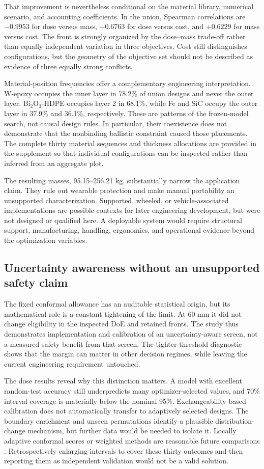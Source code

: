 \documentclass[12pt]{elsarticle}
\begin{document}
That improvement is nevertheless conditional on the material library, numerical scenario, and accounting coefficients. In the union, Spearman correlations are $-0.9953$ for dose versus mass, $-0.6763$ for dose versus cost, and $+0.6229$ for mass versus cost. The front is strongly organized by the dose--mass trade-off rather than equally independent variation in three objectives. Cost still distinguishes configurations, but the geometry of the objective set should not be described as evidence of three equally strong conflicts.

Material-position frequencies offer a complementary engineering interpretation. W-epoxy occupies the inner layer in 78.2\% of union designs and never the outer layer. Bi$_2$O$_3$-HDPE occupies layer 2 in 68.1\%, while Fe and SiC occupy the outer layer in 37.9\% and 36.1\%, respectively. These are patterns of the frozen-model search, not causal design rules. In particular, their coexistence does not demonstrate that the nonbinding ballistic constraint caused those placements. The complete thirty material sequences and thickness allocations are provided in the supplement so that individual configurations can be inspected rather than inferred from an aggregate plot.

The resulting masses, 95.15--256.21 kg, substantially narrow the application claim. They rule out wearable protection and make manual portability an unsupported characterization. Supported, wheeled, or vehicle-associated implementations are possible contexts for later engineering development, but were not designed or qualified here. A deployable system would require structural support, manufacturing, handling, ergonomics, and operational evidence beyond the optimization variables.

\subsection{Uncertainty awareness without an unsupported safety claim}
The fixed conformal allowance has an auditable statistical origin, but its mathematical role is a constant tightening of the limit. At 60 mm it did not change eligibility in the inspected DoE and retained fronts. The study thus demonstrates implementation and calibration of an uncertainty-aware screen, not a measured safety benefit from that screen. The tighter-threshold diagnostic shows that the margin can matter in other decision regimes, while leaving the current engineering requirement untouched.

The dose results reveal why this distinction matters. A model with excellent random-test accuracy still underpredicts many optimizer-selected values, and 70\% interval coverage is materially below the nominal 95\%. Exchangeability-based calibration does not automatically transfer to adaptively selected designs. The boundary enrichment and unseen permutations identify a plausible distribution-change mechanism, but further data would be needed to isolate it. Locally adaptive conformal scores or weighted methods are reasonable future comparisons \cite{Romano2019CQR,Tibshirani2019Shift}. Retrospectively enlarging intervals to cover these thirty outcomes and then reporting them as independent validation would not be a valid solution.
\end{document}
